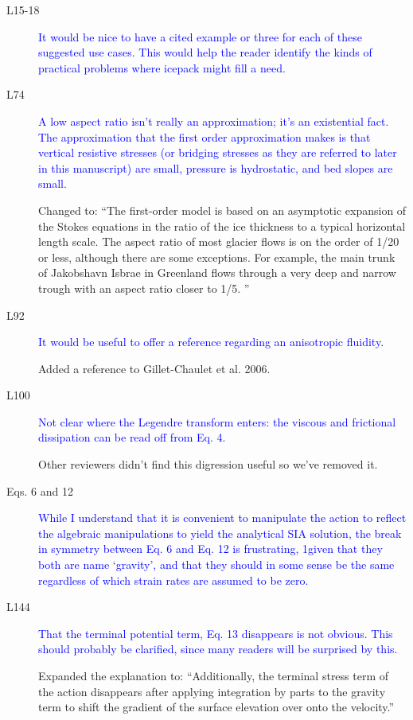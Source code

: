 \documentclass{article}
\theoremstyle{definition}
\theoremstyle{plain}
\begin{document}
\begin{description}
\item[L15-18] \textcolor{blue}{It would be nice to have a cited example or three for each of these
suggested use cases. This would help the reader identify the kinds of
practical problems where icepack might fill a need.}

\item[L74] \textcolor{blue}{A low aspect ratio isn’t really an approximation; it’s an existential fact.
The approximation that the first order approximation makes is that vertical resistive stresses (or bridging stresses as they are referred to later
in this manuscript) are small, pressure is hydrostatic, and bed slopes are
small.}

Changed to: ``The first-order model is based on an asymptotic expansion of the Stokes equations in the ratio of the ice thickness to a typical horizontal length scale.
The aspect ratio of most glacier flows is on the order of 1/20 or less, although there are some exceptions.
For example, the main trunk of Jakobshavn Isbrae in Greenland flows through a very deep and narrow trough with an aspect ratio closer to 1/5.
''

\item[L92] \textcolor{blue}{It would be useful to offer a reference regarding an anisotropic fluidity.}

Added a reference to Gillet-Chaulet et al. 2006.

\item[L100] \textcolor{blue}{Not clear where the Legendre transform enters: the viscous and frictional
dissipation can be read off from Eq. 4.}

Other reviewers didn't find this digression useful so we've removed it.

\item[Eqs. 6 and 12]\textcolor{blue}{While I understand that it is convenient to manipulate the
action to reflect the algebraic manipulations to yield the analytical SIA
solution, the break in symmetry between Eq. 6 and Eq. 12 is frustrating,
1given that they both are name ‘gravity’, and that they should in some
sense be the same regardless of which strain rates are assumed to be zero.}

\item[L144] \textcolor{blue}{That the terminal potential term, Eq. 13 disappears is not obvious. This
should probably be clarified, since many readers will be surprised by this.}

Expanded the explanation to: ``Additionally, the terminal stress term of the action disappears after applying integration by parts to the gravity term to shift the gradient of the surface elevation over onto the velocity.''


\end{description}
\end{document}
